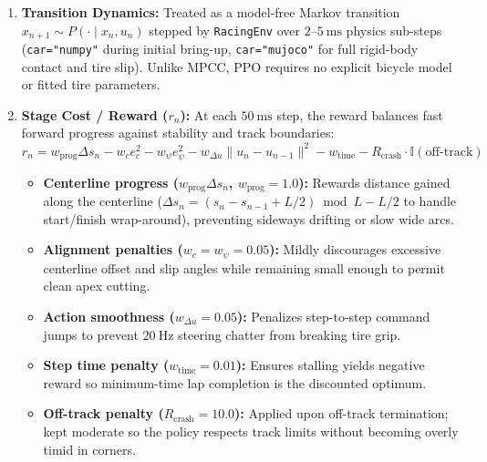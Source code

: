 \documentclass[12pt]{article}
\begin{document}
\begin{enumerate}[leftmargin=1.5em, itemsep=0.35em]
    \item \textbf{Transition Dynamics:} Treated as a model-free Markov transition $x_{n+1} \sim P(\cdot \mid x_n, u_n)$ stepped by \texttt{RacingEnv} over $2\text{--}5~\text{ms}$ physics sub-steps (\texttt{car="numpy"} during initial bring-up, \texttt{car="mujoco"} for full rigid-body contact and tire slip). Unlike MPCC, PPO requires no explicit bicycle model or fitted tire parameters.

    \item \textbf{Stage Cost / Reward ($r_n$):} At each $50~\text{ms}$ step, the reward balances fast forward progress against stability and track boundaries:
    \[
        r_n = w_{\text{prog}} \Delta s_n - w_c e_c^2 - w_\psi e_\psi^2 - w_{\Delta u} \|u_n - u_{n-1}\|^2 - w_{\text{time}} - R_{\text{crash}} \cdot \mathbb{I}(\text{off-track})
    \]
    \begin{itemize}[leftmargin=1.5em, itemsep=0.15em]
        \item \textbf{Centerline progress ($w_{\text{prog}} \Delta s_n$, $w_{\text{prog}} = 1.0$):} Rewards distance gained along the centerline ($\Delta s_n = (s_n - s_{n-1} + L/2) \bmod L - L/2$ to handle start/finish wrap-around), preventing sideways drifting or slow wide arcs.
        \item \textbf{Alignment penalties ($w_c = w_\psi = 0.05$):} Mildly discourages excessive centerline offset and slip angles while remaining small enough to permit clean apex cutting.
        \item \textbf{Action smoothness ($w_{\Delta u} = 0.05$):} Penalizes step-to-step command jumps to prevent $20~\text{Hz}$ steering chatter from breaking tire grip.
        \item \textbf{Step time penalty ($w_{\text{time}} = 0.01$):} Ensures stalling yields negative reward so minimum-time lap completion is the discounted optimum.
        \item \textbf{Off-track penalty ($R_{\text{crash}} = 10.0$):} Applied upon off-track termination; kept moderate so the policy respects track limits without becoming overly timid in corners.
    \end{itemize}


\end{enumerate}
\end{document}
